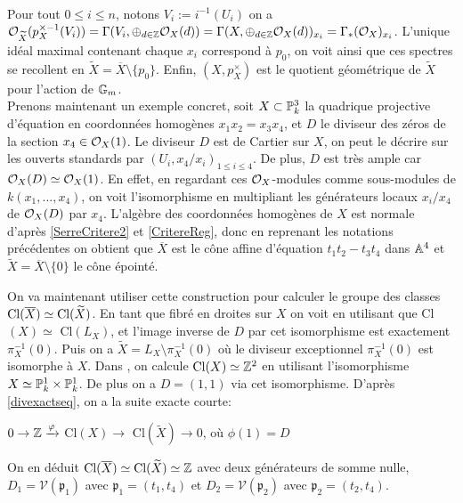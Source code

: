 	\begin{center}
	\\
	\end{center}
Pour tout $0\leq i\leq n$, notons $V_i:=i^{-1}(U_i)$ on a  $\mathcal{O}_{\widetilde{X}}(p_X^{\times-1}(V_i))=\Gamma(V_i,\oplus_{d\in \mathbb{Z}}\mathcal{O}_X(d))=\Gamma(X,\oplus_{d\in \mathbb{Z}}\mathcal{O}_X(d))_{x_i}=\Gamma_*(\mathcal{O}_X)_{x_i}$. L'unique idéal maximal contenant chaque $x_i$ correspond à $p_0$, on voit ainsi que ces spectres se recollent en $\widetilde{X}=\overline{X}\setminus \lbrace p_0 \rbrace$. Enfin, $(X,p^\times_X)$ est le quotient géométrique de $\widetilde{X}$ pour l'action de $\mathbb{G}_m$.\\

Prenons maintenant un exemple concret, soit $X\subset \mathbb{P}^3_k$ la quadrique projective d'équation en coordonnées homogènes $x_1x_2=x_3x_4$, et $D$ le diviseur des zéros de la section $x_4\in\mathcal{O}_X(1)$. Le diviseur $D$ est de Cartier sur $X$, on peut le décrire sur les ouverts standards par $(U_i, x_4/x_i)_{1\leq i\leq 4}$. De plus, $D$ est très ample car $\mathcal{O}_X(D)\simeq \mathcal{O}_X(1)$. En effet, en regardant ces $\mathcal{O}_X$-modules comme sous-modules de $k(x_1,...,x_4)$, on voit l'isomorphisme en multipliant les générateurs locaux $x_i/x_4$ de $\mathcal{O}_X(D)$ par $x_4$. L'algèbre des coordonnées homogènes de $X$ est normale d'après \ref{SerreCritere2} et \ref{CritereReg}, donc en reprenant les notations précédentes on obtient que $\overline{X}$ est le cône affine d'équation $t_1t_2-t_3t_4$ dans $\mathbb{A}^4$ et $\widetilde{X}=\overline{X}\setminus\lbrace 0 \rbrace$ le cône épointé. 

On va maintenant utiliser cette construction pour calculer le groupe des classes $\operatorname{Cl}(\overline{X})\simeq \operatorname{Cl}(\widetilde{X})$. En tant que fibré en droites sur $X$ on voit en utilisant \cite[II.6.6]{Hartshorne} que Cl$(X)\simeq$ Cl$(L_X)$, et l'image inverse de $D$ par cet isomorphisme est exactement $\pi_X^{-1}(0)$. Puis on a $\widetilde{X}=L_X \setminus \pi_X^{-1}(0)$ où le diviseur exceptionnel $\pi_X^{-1}(0)$ est isomorphe à $X$. Dans \cite[II.6.6.1]{Hartshorne}, on calcule $\operatorname{Cl}(X)\simeq \mathbb{Z}^2$ en utilisant l'isomorphisme $X\simeq \mathbb{P}_k^1\times \mathbb{P}_k^1$. De plus on a $D=(1,1)$ via cet isomorphisme. D'après \ref{divexactseq}, on a la suite exacte courte:
\begin{center}
$ 0\rightarrow\mathbb{Z}\xrightarrow{\varphi}$ Cl$(X) \rightarrow$ Cl$(\widetilde{X}) \rightarrow 0$, où $\phi(1)=D$
\end{center}
On en déduit $\operatorname{Cl}(\overline{X})\simeq\operatorname{Cl}(\widetilde{X})\simeq \mathbb{Z}$ avec deux générateurs de somme nulle, $D_1=\mathcal{V}(\mathfrak{p}_1)$ avec $\mathfrak{p}_1=(t_1,t_4)$ et $D_2=\mathcal{V}(\mathfrak{p}_2)$ avec $\mathfrak{p}_2=(t_2,t_4)$.\\

